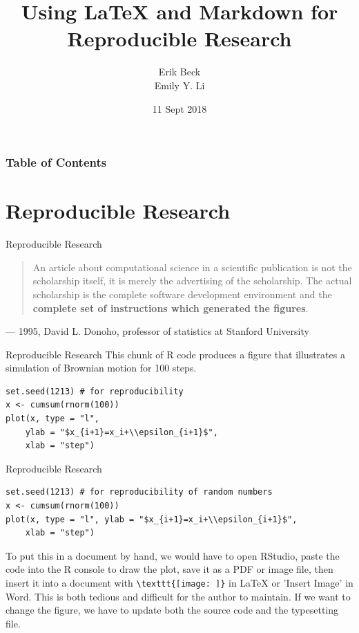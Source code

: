 \documentclass{beamer}
\title{Using LaTeX and Markdown for Reproducible Research}
\subtitle{}
\author{Erik Beck \\ Emily Y. Li}
\institute{2018 US EPA \\ R User Group Workshop}
\date{11 Sept 2018}
\begin{document}
    \begin{frame}
        \maketitle
    \end{frame}
    
    \begin{frame}
        \frametitle{Table of Contents}
        \tableofcontents
    \end{frame}
    
    \section{Reproducible Research}
    \begin{frame}{Reproducible Research}
            \begin{quote}
            An article about computational science in a scientific publication is not the scholarship itself, it is merely the advertising of the scholarship. The actual scholarship is the complete software development environment and the \textbf{complete set of instructions which generated the figures}.
        \end{quote}
        --- 1995, David L. Donoho, professor of statistics at Stanford University
    \end{frame}
    
\begin{frame}[fragile]{Reproducible Research}
This chunk of R code produces a figure that illustrates a simulation of Brownian motion for 100 steps.
\begin{lstlisting}
set.seed(1213) # for reproducibility 
x <- cumsum(rnorm(100))
plot(x, type = "l",
    ylab = "$x_{i+1}=x_i+\\epsilon_{i+1}$",
    xlab = "step")
\end{lstlisting}
\end{frame}

\begin{frame}[fragile]{Reproducible Research}
\begin{lstlisting}
set.seed(1213) # for reproducibility of random numbers
x <- cumsum(rnorm(100))
plot(x, type = "l", ylab = "$x_{i+1}=x_i+\\epsilon_{i+1}$",
    xlab = "step")
\end{lstlisting}
To put this in a document by hand, we would have to open RStudio, paste the code into the R console to draw the plot, save it as a PDF or image file, then insert it into a document with \verb|\texttt{[image: ]}| in LaTeX or 'Insert Image' in Word. This is both tedious and difficult for the author to maintain. If we want to change the figure, we have to update both the source code and the typesetting file.
\end{frame}
\end{document}
